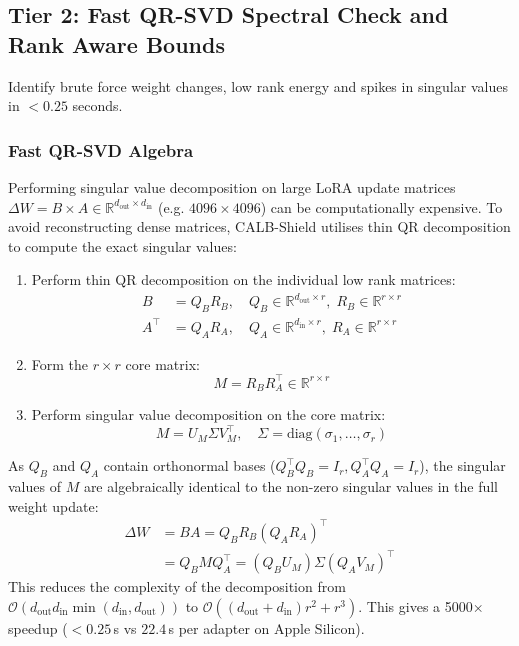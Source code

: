 \subsection{Tier 2: Fast QR-SVD Spectral Check and Rank Aware Bounds}
\label{subsec:tier2}

Identify brute force weight changes, low rank energy and spikes in singular values in $< 0.25$ seconds.

\subsubsection{Fast QR-SVD Algebra}
Performing singular value decomposition on large LoRA update matrices $\Delta W = B \times A \in \mathbb{R}^{d_{\text{out}} \times d_{\text{in}}}$ (e.g. $4096 \times 4096$) can be computationally expensive. To avoid reconstructing dense matrices, CALB-Shield utilises thin QR decomposition to compute the exact singular values:
\begin{enumerate}
    \item Perform thin QR decomposition on the individual low rank matrices:
    \begin{align}
    B &= Q_B R_B, \quad Q_B \in \mathbb{R}^{d_{\text{out}} \times r}, \; R_B \in \mathbb{R}^{r \times r} \\
    A^\top &= Q_A R_A, \quad Q_A \in \mathbb{R}^{d_{\text{in}} \times r}, \; R_A \in \mathbb{R}^{r \times r}
    \end{align}
    \item Form the $r \times r$ core matrix:
    \begin{equation}
    M = R_B R_A^\top \in \mathbb{R}^{r \times r}
    \end{equation}
    \item Perform singular value decomposition on the core matrix:
    \begin{equation}
    M = U_M \Sigma V_M^\top, \quad \Sigma = \text{diag}(\sigma_1, \dots, \sigma_r)
    \end{equation}
\end{enumerate}
As $Q_B$ and $Q_A$ contain orthonormal bases ($Q_B^\top Q_B = I_r, Q_A^\top Q_A = I_r$), the singular values of $M$ are algebraically identical to the non-zero singular values in the full weight update:
\begin{align}
\Delta W &= B A = Q_B R_B (Q_A R_A)^\top \nonumber \\
&= Q_B M Q_A^\top = (Q_B U_M) \Sigma (Q_A V_M)^\top
\end{align}
This reduces the complexity of the decomposition from $\mathcal{O}(d_{\text{out}} d_{\text{in}} \min(d_{\text{in}}, d_{\text{out}}))$ to $\mathcal{O}((d_{\text{out}} + d_{\text{in}}) r^2 + r^3)$. This gives a 5000$\times$ speedup ($< 0.25$\,s vs $22.4$\,s per adapter on Apple Silicon).

